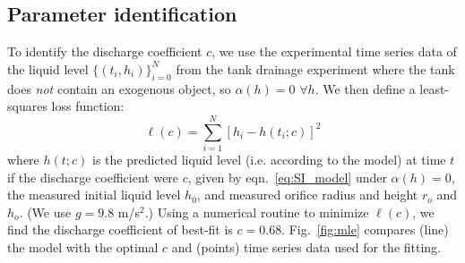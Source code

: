 \documentclass[a4paper,fleqn]{cas-sc}
\begin{document}
 \subsection{Parameter identification}
 To identify the discharge coefficient $c$, we use the experimental time series data of the liquid level $\{(t_i, h_i)\}_{i=0}^N$ from the tank drainage experiment where the tank does \emph{not} contain an exogenous object, so $\alpha(h) = 0$ $\forall h$. We then define a least-squares loss function:
 \begin{equation}
 	\ell(c) = \displaystyle\sum_{i=1}^N [h_i - h(t_i; c)]^2
 \end{equation} where $h(t;c)$ is the predicted liquid level (i.e. according to the model) at time $t$ if the discharge coefficient were $c$, given by eqn.~\ref{eq:SI_model} under $\alpha(h)=0$, the measured initial liquid level $h_0$, and measured orifice radius and height $r_o$ and $h_o$. (We use $g=9.8$ m/s$^2$.)
 Using a numerical routine to minimize $\ell(c)$, we find the discharge coefficient of best-fit is $c=0.68$. Fig.~\ref{fig:mle} compares (line) the model with the optimal $c$ and (points) time series data used for the fitting.
 
\end{document}
